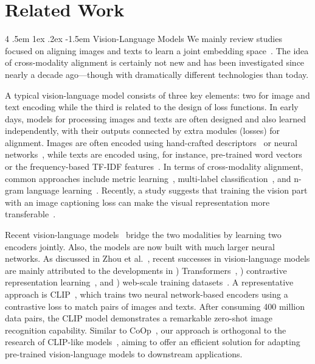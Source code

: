 \documentclass[10pt,twocolumn,letterpaper]{article}
\makeatletter
\renewcommand\paragraph{
  \@startsection{paragraph} %
  {4} %
  {\z@} %
  {.5em \@plus1ex \@minus.2ex} %
  {-1.5em} %
  {\normalfont\normalsize\bfseries} %
}
\newcommand{\romannum}[1]{\romannumeral #1} %
\makeatother
\begin{document}
\section{Related Work}
\label{sec:related_work}

\paragraph{Vision-Language Models}
We mainly review studies focused on aligning images and texts to learn a joint embedding space~\cite{radford2021learning,jia2021scaling,zhang2020contrastive}. The idea of cross-modality alignment is certainly not new and has been investigated since nearly a decade ago---though with dramatically different technologies than today.

A typical vision-language model consists of three key elements: two for image and text encoding while the third is related to the design of loss functions. In early days, models for processing images and texts are often designed and also learned independently, with their outputs connected by extra modules (losses) for alignment. Images are often encoded using hand-crafted descriptors~\cite{socher2013zero,elhoseiny2013write} or neural networks~\cite{frome2013devise,lei2015predicting}, while texts are encoded using, for instance, pre-trained word vectors~\cite{socher2013zero,frome2013devise} or the frequency-based TF-IDF features~\cite{elhoseiny2013write,lei2015predicting}. In terms of cross-modality alignment, common approaches include metric learning~\cite{frome2013devise}, multi-label classification~\cite{joulin2016learning,gomez2017self}, and n-gram language learning~\cite{li2017learning}. Recently, a study suggests that training the vision part with an image captioning loss can make the visual representation more transferable~\cite{desai2021virtex}.

Recent vision-language models~\cite{radford2021learning,jia2021scaling,furst2021cloob,li2021supervision} bridge the two modalities by learning two encoders jointly. Also, the models are now built with much larger neural networks. As discussed in Zhou et al.~\cite{zhou2021coop}, recent successes in vision-language models are mainly attributed to the developments in \romannum{1}) Transformers~\cite{vaswani2017attention}, \romannum{2}) contrastive representation learning~\cite{chen2020simple,he2020momentum,henaff2020data}, and \romannum{3}) web-scale training datasets~\cite{radford2021learning,jia2021scaling}. A representative approach is CLIP~\cite{radford2021learning}, which trains two neural network-based encoders using a contrastive loss to match pairs of images and texts. After consuming 400 million data pairs, the CLIP model demonstrates a remarkable zero-shot image recognition capability. Similar to CoOp~\cite{zhou2021coop}, our approach is orthogonal to the research of CLIP-like models~\cite{radford2021learning,jia2021scaling,furst2021cloob,li2021supervision}, aiming to offer an efficient solution for adapting pre-trained vision-language models to downstream applications.
\end{document}
